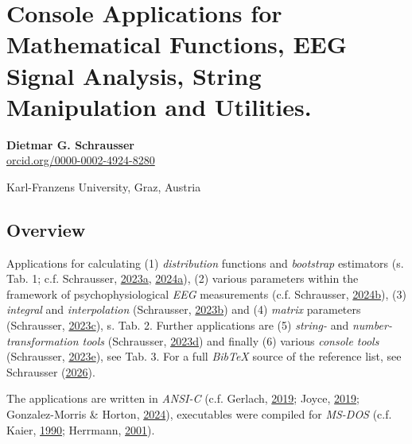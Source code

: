 \documentclass[
]{article}
\author{Dietmar Gerald SCHRAUSSER}
\date{12.04.2026}
\begin{document}
\hypertarget{console-applications-for-mathematical-functions-eeg-signal-analysis-string-manipulation-and-utilities.}{%
\section{Console Applications for Mathematical Functions, EEG Signal
Analysis, String Manipulation and
Utilities.}\label{console-applications-for-mathematical-functions-eeg-signal-analysis-string-manipulation-and-utilities.}}

\textbf{Dietmar G. Schrausser}\\
\href{https://orcid.org/0000-0002-4924-8280}{orcid.org/0000-0002-4924-8280}

Karl-Franzens University, Graz, Austria

\hypertarget{overview}{%
\subsection{Overview}\label{overview}}

Applications for calculating (1) \emph{distribution} functions and
\emph{bootstrap} estimators (s. Tab. 1; c.f. Schrausser,
\href{https://doi.org/10.5281/zenodo.7664141}{2023a},
\href{https://doi.org/10.31234/osf.io/rvzxa}{2024a}), (2) various
parameters within the framework of psychophysiological \emph{EEG}
measurements (c.f. Schrausser,
\href{https://doi.org/10.5281/zenodo.10701349}{2024b}), (3)
\emph{integral} and \emph{interpolation} (Schrausser,
\href{https://doi.org/10.5281/zenodo.7655056}{2023b}) and (4)
\emph{matrix} parameters (Schrausser,
\href{https://doi.org/10.5281/zenodo.7655046}{2023c}), s. Tab. 2.
Further applications are (5) \emph{string-} and \emph{number-}
\emph{transformation tools} (Schrausser,
\href{https://doi.org/10.5281/zenodo.7653790}{2023d}) and finally (6)
various \emph{console tools} (Schrausser,
\href{https://doi.org/10.5281/zenodo.7655239}{2023e}), see Tab. 3. For a
full \emph{BibTeX} source of the reference list, see Schrausser
(\href{https://doi.org/10.5281/zenodo.19513238}{2026}).

The applications are written in \emph{ANSI-C} (c.f. Gerlach,
\href{https://doi.org/10.1007/978-3-662-59246-5_4}{2019}; Joyce,
\href{https://doi.org/10.1007/978-1-4842-5064-8}{2019}; Gonzalez-Morris
\& Horton, \href{https://doi.org/10.1007/979-8-8688-0149-5}{2024}),
executables were compiled for \emph{MS-DOS} (c.f. Kaier,
\href{https://doi.org/10.1007/978-3-322-89035-1_1}{1990}; Herrmann,
\href{https://doi.org/10.1007/978-3-322-94365-1_16}{2001}).
\end{document}
